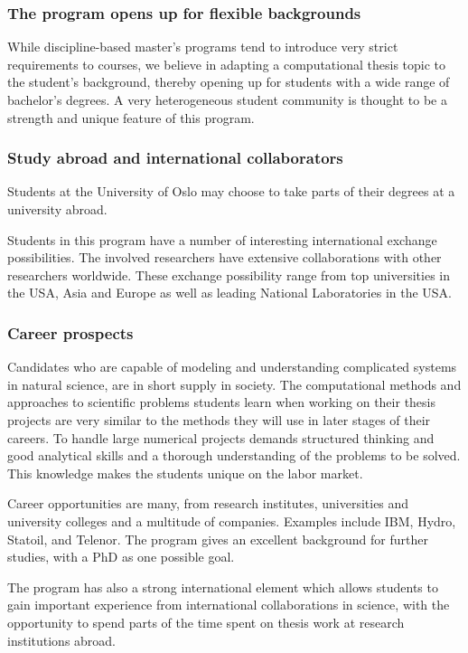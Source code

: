 \documentclass{beamer}
\begin{document}
\begin{frame}
\frametitle{The program opens up for flexible backgrounds}

\begin{block}{}
While discipline-based master's programs tend to introduce very strict
requirements to courses, we believe in adapting a computational thesis
topic to the student's background, thereby opening up for
students with a wide range of bachelor's degrees.
A very heterogeneous student community is thought to be a strength and
unique feature of this program.
\end{block}
\end{frame}

\begin{frame}
\frametitle{Study abroad and international collaborators}

\begin{block}{}

Students at the University of Oslo may choose to take parts of
their degrees at a university abroad.

Students in this program have a number of interesting international
exchange possibilities. The involved researchers have extensive
collaborations with other researchers worldwide. These exchange
possibility range from top universities in the USA, Asia and Europe as
well as leading National Laboratories in the USA.

\end{block}
\end{frame}

\begin{frame}
\frametitle{Career prospects}

\begin{block}{}
Candidates who are capable of modeling and understanding complicated
systems in natural science, are in short supply in society.  The
computational methods and approaches to scientific problems students learn
when working on their thesis projects are very similar to the methods
they will use in later stages of their careers.  To handle large
numerical projects demands structured thinking and good analytical
skills and a thorough understanding of the problems to be solved. This
knowledge makes the students unique on the labor market.

Career opportunities are many, from research institutes, universities
and university colleges and a multitude of companies. Examples
include IBM, Hydro, Statoil, and Telenor.  The program gives an
excellent background for further studies, with a PhD as one possible
goal.

The program has also a strong international element which allows students to
gain important experience from international collaborations in
science, with the opportunity to spend parts of the time spent on
thesis work at research institutions abroad.
\end{block}
\end{frame}
\end{document}
